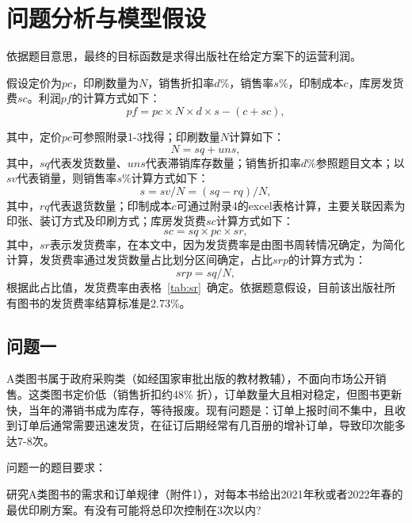 \documentclass[bwprint]{gmcmthesis}
\begin{document}
\section{问题分析与模型假设}

依据题目意思，最终的目标函数是求得出版社在给定方案下的运营利润。

假设定价为$pc$，印刷数量为$N$，销售折扣率$d\%$，销售率$s\%$，印制成本$c$，库房发货费$sc$。利润$pf$的计算方式如下：
\begin{equation}
\label{eq:pf}
  pf = pc\times N\times d\times s - (c + sc),
\end{equation}	

其中，定价$pc$可参照附录1-3找得；印刷数量$N$计算如下：
\begin{equation}
\label{eq:N}
  N = sq + uns,
\end{equation}
其中，$sq$代表发货数量、$uns$代表滞销库存数量；销售折扣率$d\%$参照题目文本；以$sv$代表销量，则销售率$s\%$计算方式如下：
\begin{equation}
\label{eq:s}
  s = sv / N = (sq - rq) / N,
\end{equation}
其中，$rq$代表退货数量；印制成本$c$可通过附录4的excel表格计算，主要关联因素为印张、装订方式及印刷方式；库房发货费$sc$计算方式如下：
\begin{equation}
\label{eq:sc}
  sc = sq\times pc\times sr,
\end{equation}
其中，$sr$表示发货费率，在本文中，因为发货费率是由图书周转情况确定，为简化计算，发货费率通过发货数量占比划分区间确定，占比$srp$的计算方式为：
\begin{equation}
\label{eq:srp}
  srp = sq / N,
\end{equation}
根据此占比值，发货费率由表格~\ref{tab:sr}~确定。依据题意假设，目前该出版社所有图书的发货费率结算标准是2.73\%。


\subsection{问题一}

A类图书属于政府采购类（如经国家审批出版的教材教辅），不面向市场公开销售。这类图书定价低（销售折扣约48\% 折），订单数量大且相对稳定，但图书更新快，当年的滞销书成为库存，等待报废。现有问题是：订单上报时间不集中，且收到订单后通常需要迅速发货，在征订后期经常有几百册的增补订单，导致印次能多达7-8次。

问题一的题目要求：

研究A类图书的需求和订单规律（附件1），对每本书给出2021年秋或者2022年春的最优印刷方案。有没有可能将总印次控制在3次以内? 
\end{document}
